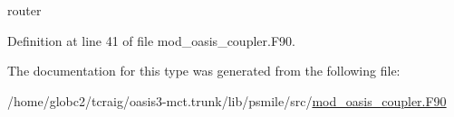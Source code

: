router 



Definition at line 41 of file mod\+\_\+oasis\+\_\+coupler.\+F90.



The documentation for this type was generated from the following file\+:\begin{DoxyCompactItemize}
\item 
/home/globc2/tcraig/oasis3-\/mct.\+trunk/lib/psmile/src/\hyperlink{mod__oasis__coupler_8_f90}{mod\+\_\+oasis\+\_\+coupler.\+F90}\end{DoxyCompactItemize}
